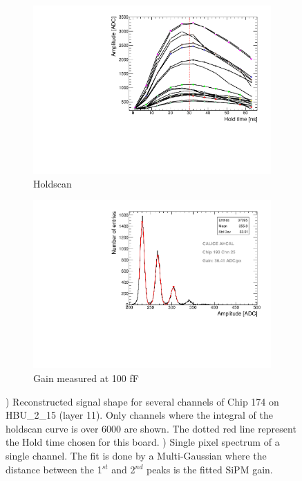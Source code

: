 \begin{figure}[htbp!]
  \centering
  \begin{subfigure}[t]{0.49\textwidth}
    \includegraphics[width=1.\linewidth]{../Thesis_Plots/Commissioning/Plots/Holdscan_HBU2_15.pdf}
    \caption{Holdscan} \label{fig:Holdscan}
  \end{subfigure}
  \hfill
  \begin{subfigure}[t]{0.49\textwidth}
    \includegraphics[width=1.\linewidth]{../Thesis_Plots/Commissioning/Plots/Gain100fF_MainzHBU4.pdf}
    \caption{Gain measured at 100 fF} \label{fig:Gain100fF}
  \end{subfigure}
  \caption{) Reconstructed signal shape for several channels of Chip 174 on HBU\_{}2\_{}15 (layer 11). Only channels where the integral of the holdscan curve is over 6000 are shown. The dotted red line represent the Hold time chosen for this board. ) Single pixel spectrum of a single channel. The fit is done by a Multi-Gaussian where the distance between the 1$^{st}$ and 2$^{nd}$ peaks is the fitted SiPM gain.}
\end{figure}


